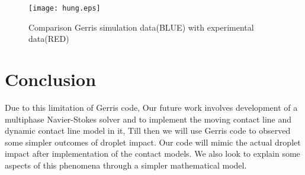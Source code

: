 \begin{figure}[tpb]
\centering
 \texttt{[image: hung.eps]}
 \caption{Comparison Gerris simulation data(BLUE) with \cite{Hung2011} experimental data(RED)}
\end{figure}

\section{Conclusion}
Due to this limitation of Gerris code, Our future work involves development of a multiphase Navier-Stokes solver and to implement the moving contact line and dynamic contact line model in it, 
Till then we will use Gerris code to observed some simpler outcomes of droplet impact. Our code will mimic the actual droplet impact after implementation of the contact models. We also
look to explain some aspects of this phenomena through a simpler mathematical model.

